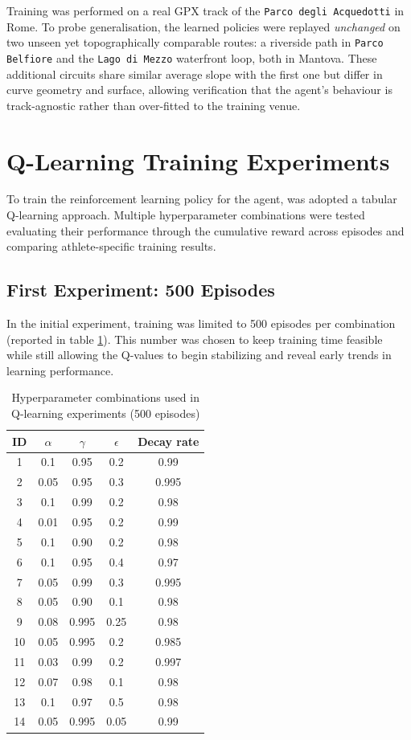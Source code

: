 Training was performed on a real GPX track of the \texttt{Parco degli Acquedotti} in Rome. To probe generalisation, the learned policies were replayed \emph{unchanged} on two unseen yet topographically comparable routes: a riverside path in \texttt{Parco Belfiore} and the \texttt{Lago di Mezzo} waterfront loop, both in Mantova. These additional circuits share similar average slope with the first one but differ in curve geometry and surface, allowing verification that the agent’s behaviour is track-agnostic rather than over-fitted to the training venue.

\section{Q-Learning Training Experiments}

To train the reinforcement learning policy for the agent, was adopted a tabular Q-learning approach. Multiple hyperparameter combinations were tested evaluating their performance through the cumulative reward across episodes and comparing athlete-specific training results.

\subsection{First Experiment: 500 Episodes}
In the initial experiment, training was limited to 500 episodes per combination (reported in table \ref{tab:hyperparameters-500}). This number was chosen to keep training time feasible while still allowing the Q-values to begin stabilizing and reveal early trends in learning performance.

\begin{table}[H]
\centering
\begin{tabular}{|c|c|c|c|c|}
\hline
\textbf{ID} & $\alpha$ & $\gamma$ & $\epsilon$ & \textbf{Decay rate} \\
\hline
1  & 0.1  & 0.95  & 0.2  & 0.99  \\
2  & 0.05 & 0.95  & 0.3  & 0.995 \\
3  & 0.1  & 0.99  & 0.2  & 0.98  \\
4  & 0.01 & 0.95  & 0.2  & 0.99  \\
5  & 0.1  & 0.90  & 0.2  & 0.98  \\
6  & 0.1  & 0.95  & 0.4  & 0.97  \\
7  & 0.05 & 0.99  & 0.3  & 0.995 \\
8  & 0.05 & 0.90  & 0.1  & 0.98  \\
9  & 0.08 & 0.995 & 0.25 & 0.98  \\
10 & 0.05 & 0.995 & 0.2  & 0.985 \\
11 & 0.03 & 0.99  & 0.2  & 0.997 \\
12 & 0.07 & 0.98  & 0.1  & 0.98  \\
13 & 0.1  & 0.97  & 0.5  & 0.98  \\
14 & 0.05 & 0.995 & 0.05 & 0.99  \\
\hline
\end{tabular}
\label{tab:hyperparameters-500}
\caption{Hyperparameter combinations used in Q-learning experiments (500 episodes)}
\end{table}

